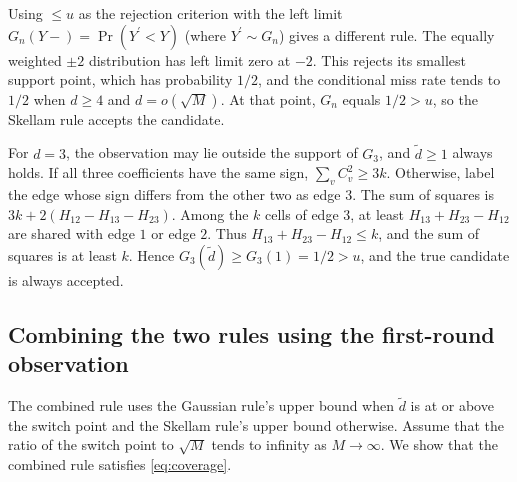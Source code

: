 Using $\le u$ as the rejection criterion with the left limit $G_n(Y-)=\Pr(Y^{\prime}<Y)$ (where $Y^{\prime}\sim G_n$) gives a different rule. The equally weighted $\pm2$ distribution has left limit zero at $-2$. This rejects its smallest support point, which has probability $1/2$, and the conditional miss rate tends to $1/2$ when $d\ge4$ and $d=o(\sqrt M)$. At that point, $G_n$ equals $1/2>u$, so the Skellam rule accepts the candidate.

For $d=3$, the observation may lie outside the support of $G_3$, and $\widetilde d\ge1$ always holds. If all three coefficients have the same sign, $\sum_vC_v^2\ge3k$. Otherwise, label the edge whose sign differs from the other two as edge $3$. The sum of squares is $3k+2(H_{12}-H_{13}-H_{23})$. Among the $k$ cells of edge $3$, at least $H_{13}+H_{23}-H_{12}$ are shared with edge $1$ or edge $2$. Thus $H_{13}+H_{23}-H_{12}\le k$, and the sum of squares is at least $k$. Hence $G_3(\widetilde d)\ge G_3(1)=1/2>u$, and the true candidate is always accepted.

\subsection{Combining the two rules using the first-round observation}\label{app:switch}
The combined rule uses the Gaussian rule's upper bound when $\widetilde d$ is at or above the switch point and the Skellam rule's upper bound otherwise. Assume that the ratio of the switch point to $\sqrt{M}$ tends to infinity as $M\to\infty$. We show that the combined rule satisfies \eqref{eq:coverage}.

